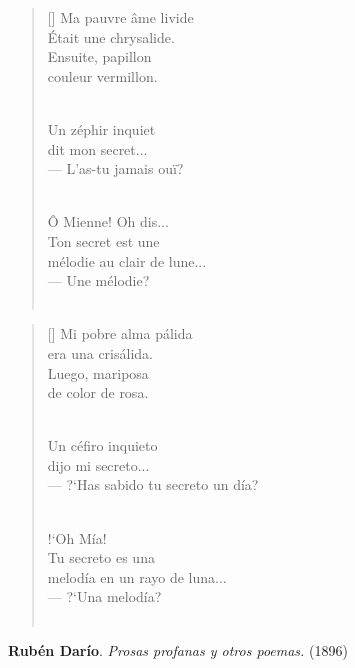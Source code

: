 



\settowidth{\versewidth}{mélodie au clair de lune...}

\bigskip

\begin{verse}[\versewidth]
Ma pauvre âme livide \\
Était une chrysalide. \\
Ensuite, papillon \\
couleur vermillon. \\ \

Un zéphir inquiet \\
dit mon secret... \\
--- L'as-tu jamais ouï? \\ \

Ô Mienne! Oh dis... \\
Ton secret est une \\
mélodie au clair de lune... \\
--- Une mélodie? \\ \
\end{verse}

\bigskip \bigskip \bigskip



\settowidth{\versewidth}{--- ?`Has sabido tu secreto un día?}

\bigskip

\begin{verse}[\versewidth]
Mi pobre alma pálida \\
era una crisálida. \\
Luego, mariposa \\
de color de rosa. \\ \

Un céfiro inquieto \\
dijo mi secreto... \\
--- ?`Has sabido tu secreto un día? \\ \

!`Oh Mía! \\
Tu secreto es una \\
melodía en un rayo de luna... \\
--- ?`Una melodía? \\ \
\end{verse}

\bigskip \bigskip

\hspace*{20mm} {\bf Rubén Darío}. {\em Prosas profanas y otros poemas.} (1896)
